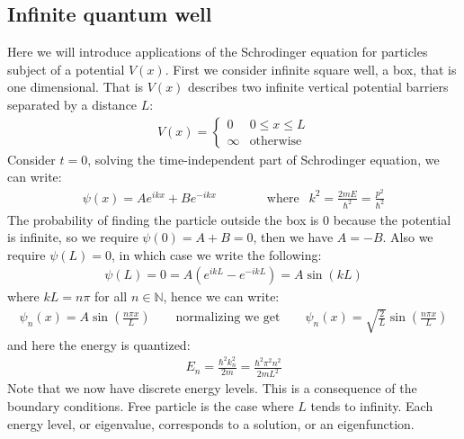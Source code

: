 \documentclass[11pt]{article}
\theoremstyle{break}
\theoremstyle{break}
\newcommand{\N}{\mathbb{N}}
\begin{document}
\subsection{Infinite quantum well}
Here we will introduce applications of the Schrodinger equation for particles subject of a potential $V(x)$. First we consider infinite square well, a box, that is one dimensional. That is $V(x)$ describes two infinite vertical potential barriers separated by a distance $L$:
\begin{align*}
V(x) = \begin{cases}
0 & 0\leq x \leq L\\
\infty & \text{otherwise}
\end{cases}
\end{align*}
Consider $t=0$, solving the time-independent part of Schrodinger equation, we can write:
\begin{align*}
\psi(x) = Ae^{ikx}+ B e^{-ikx}\qquad\qquad\text{where } \ \ k^2= \frac{2mE}{\hbar^2} = \frac{p^2}{\hbar^2} 
\end{align*}
The probability of finding the particle outside the box is $0$ because the potential is infinite, so we require $\psi(0) = A+B=0$, then we have $A = -B$. Also we require $\psi(L) = 0$, in which case we write the following:
\begin{align*}
\psi(L) = 0 = A(e^{ikL} - e^{-ikL}) = A\sin(kL) 
\end{align*} 
where $kL = n\pi$ for all $n \in \N$, hence we can write:
\begin{align*}
\psi_n(x) = A\sin\left( \frac{n\pi x}{L}\right) \qquad \text{normalizing we get}\qquad \psi_n(x) = \sqrt{\frac{2}{L}}\sin\left( \frac{n\pi x}{L}\right)
\end{align*}
and here the energy is quantized:
\begin{align*}
E_n = \frac{\hbar^2 k_n^2}{2m} = \frac{\hbar^2 \pi^2 n^2}{2mL^2}
\end{align*}
Note that we now have discrete energy levels. This is a consequence of the boundary conditions. Free particle is the case where $L$ tends to infinity.
Each energy level, or eigenvalue, corresponds to a solution, or an eigenfunction. \\
\end{document}
